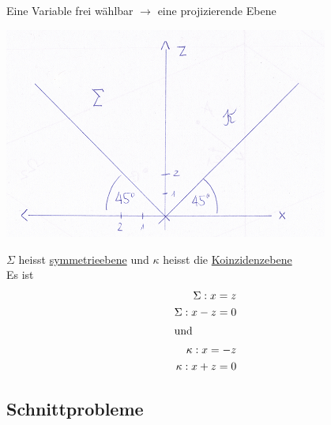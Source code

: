 Eine Variable frei wählbar $\to$ eine projizierende Ebene\\
\begin{center}
	 \includegraphics[width=0.8\textwidth]{imgs/symmetrie_koinzidenzebene.png}
 \end{center}
$\Sigma$ heisst \underline{symmetrieebene} und $\kappa$ heisst die \underline{Koinzidenzebene}\\
Es ist
\begin{eqnarray*}
	\Sigma: x = z\\
	\Sigma: x-z =0\\
	\shortintertext{und}
	\kappa: x = -z\\
	\kappa: x + z = 0
\end{eqnarray*} 
\newpage
\subsection{Schnittprobleme}
